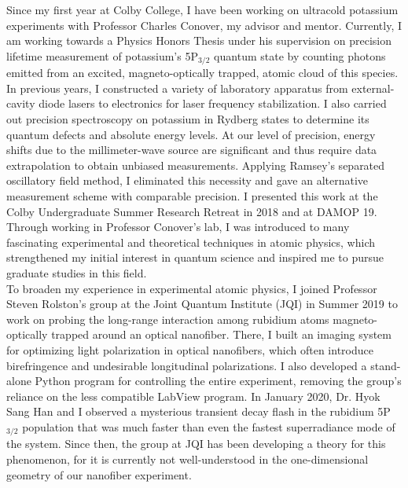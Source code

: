 Since my first year at Colby College, I have been working on ultracold potassium experiments with Professor Charles Conover, my advisor and mentor. Currently, I am working towards a Physics Honors Thesis under his supervision on precision lifetime measurement of potassium's 5P$_{\text{3/2}}$ quantum state by counting photons emitted from an excited, magneto-optically trapped, atomic cloud of this species. In previous years, I constructed a variety of laboratory apparatus from external-cavity diode lasers to electronics for laser frequency stabilization. I also carried out precision spectroscopy on potassium in Rydberg states to determine its quantum defects and absolute energy levels. At our level of precision, energy shifts due to the millimeter-wave source are significant and thus require data extrapolation to obtain unbiased measurements. Applying Ramsey's separated oscillatory field method, I eliminated this necessity and gave an alternative measurement scheme with comparable precision. I presented this work at the Colby Undergraduate Summer Research Retreat in 2018 and at DAMOP 19. Through working in Professor Conover's lab, I was introduced to many fascinating experimental and theoretical techniques in atomic physics, which strengthened my initial interest in quantum science and inspired me to pursue graduate studies in this field.  \\


To broaden my experience in experimental atomic physics, I joined Professor Steven Rolston's group at the Joint Quantum Institute (JQI) in Summer 2019 to work on probing the long-range interaction among rubidium atoms magneto-optically trapped around an optical nanofiber. There, I built an imaging system for optimizing light polarization in optical nanofibers, which often introduce birefringence and undesirable longitudinal polarizations. I also developed a stand-alone Python program for controlling the entire experiment, removing the group's reliance on the less compatible LabView program. In January 2020, Dr. Hyok Sang Han and I observed a mysterious transient decay flash in the rubidium 5P$_{\text{3/2}}$ population that was much faster than even the fastest superradiance mode of the system.  Since then, the group at JQI has been developing a theory for this phenomenon, for it is currently not well-understood in the one-dimensional geometry of our nanofiber experiment. \\ 



